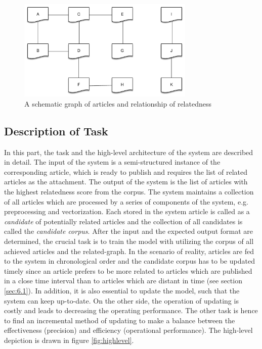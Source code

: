 \begin{figure}[!htb]
    \centering
    \includegraphics[width=0.75\textwidth]{fig/relatedness.pdf}
    \caption{A schematic graph of articles and relationship of relatedness}
    \label{fig:relatedness}
\end{figure}

\bigbreak
\subsection{Description of Task}
\label{sec:3.2}

In this part, the task and the high-level architecture of the system are described in detail. The input of the system is a semi-structured instance of the corresponding article, which is ready to publish and requires the list of related articles as the attachment. The output of the system is the list of articles with the highest relatedness score from the corpus. The system maintains a collection of all articles which are processed by a series of components of the system, e.g. preprocessing and vectorization. Each stored in the system article is called as a \textit{candidate} of potentially related articles and the collection of all candidates is called the \textit{candidate corpus}. After the input and the expected output format are determined, the crucial task is to train the model with utilizing the corpus of all achieved articles and the related-graph. In the scenario of reality, articles are fed to the system in chronological order and the candidate corpus has to be updated timely since an article prefers to be more related to articles which are published in a close time interval than to articles which are distant in time (see section \ref{sec:6.1}). In addition, it is also essential to update the model, such that the system can keep up-to-date. On the other side, the operation of updating is costly and leads to decreasing the operating performance. The other task is hence to find an incremental method of updating to make a balance between the effectiveness (precision) and efficiency (operational performance). The high-level depiction is drawn in figure \ref{fig:highlevel}. 

